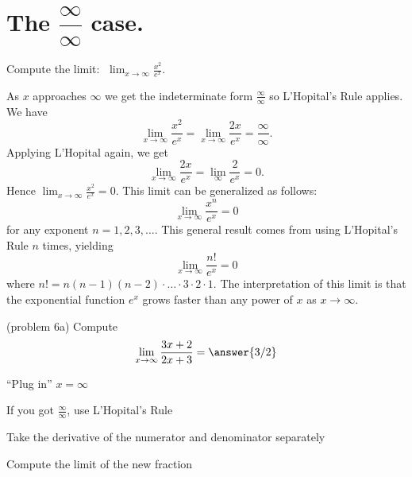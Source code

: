 \documentclass[handout]{ximera}
\begin{document}
\section{ The $\dfrac{\infty}{\infty}$ case.}



\begin{example}[example 6]
Compute the limit:  $\displaystyle{\;\lim_{x \to \infty} \frac{x^2}{e^x}}.$

As $x$ approaches $\infty$ we get the indeterminate form $\frac{\infty}{\infty}$ so L'Hopital's Rule applies.
We have 
\[\lim_{x\to \infty} \frac{x^2}{e^x} = \lim_{x \to \infty} \frac{2x}{e^x} = \frac{\infty}{\infty}.\]
Applying L'Hopital again, we get
\[\lim_{x \to \infty} \frac{2x}{e^x} = \lim_{\infty} \frac{2}{e^x} = 0.\]
Hence $\lim_{x\to\infty}\frac{x^2}{e^x}=0$.  
This limit can be generalized as follows:
\[\lim_{x\to\infty}\frac{x^n}{e^x} =0\]
for any exponent $n = 1, 2, 3, \dots$.
This general result comes from using L'Hopital's Rule $n$ times, yielding
\[\lim_{x\to\infty} \frac{n!}{e^x} =0\]
where $n! = n(n-1)(n-2)\cdot \dots \cdot 3\cdot 2\cdot 1$.
The interpretation of this limit is that the exponential function $e^x$ grows faster than any power of $x$ as $x \to \infty$.
\end{example}




\begin{problem}(problem 6a)
  Compute
  \[
  \lim_{x \to \infty} \frac{3x+2}{2x + 3} = \answer{3/2}
  \]
  
    \begin{hint}
      ``Plug in'' $x=\infty$
    \end{hint}
    \begin{hint}
      If you got $\frac{\infty}{\infty}$, use L'Hopital's Rule
    \end{hint}
    \begin{hint}
      Take the derivative of the numerator and denominator separately
    \end{hint}
		\begin{hint}
      Compute the limit of the new fraction
    \end{hint}
	
\end{problem}
\end{document}
